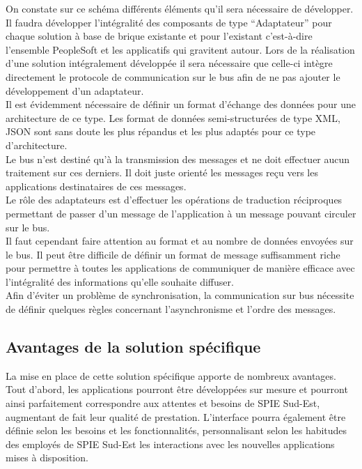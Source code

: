On constate sur ce schéma différents éléments qu’il sera nécessaire de développer. Il faudra développer l’intégralité des composants de type “Adaptateur” pour chaque solution à base de brique existante et pour l’existant c’est-à-dire l’ensemble PeopleSoft et les applicatifs qui gravitent autour. Lors de la réalisation d’une solution intégralement développée il sera nécessaire que celle-ci intègre directement le protocole de communication sur le bus afin de ne pas ajouter le développement d’un adaptateur. \\
    
Il est évidemment nécessaire de définir un format d’échange des données pour une architecture de ce type. Les format de données semi-structurées de type XML, JSON sont sans doute les plus répandus et les plus adaptés pour ce type d’architecture. \\

Le bus n’est destiné qu’à la transmission des messages et ne doit effectuer aucun traitement sur ces derniers. Il doit juste orienté les messages reçu vers les applications destinataires de ces messages. \\

Le rôle des adaptateurs est d’effectuer les opérations de traduction réciproques permettant de passer d’un message de l’application à un message pouvant circuler sur le bus. \\

Il faut cependant faire attention au format et au nombre de données envoyées sur le bus. Il peut être difficile de définir un format de message suffisamment riche pour permettre à toutes les applications de communiquer de manière efficace avec l’intégralité des informations qu’elle souhaite diffuser. \\

Afin d’éviter un problème de synchronisation, la communication sur bus nécessite de définir quelques règles concernant l’asynchronisme et l’ordre des messages. 

\subsection{Avantages de la solution spécifique}

La mise en place de cette solution spécifique apporte de nombreux avantages. Tout d’abord, les applications pourront être développées sur mesure et pourront ainsi parfaitement correspondre aux attentes et besoins de SPIE Sud-Est, augmentant de fait leur qualité de prestation. L’interface pourra également être définie selon les besoins et les fonctionnalités, personnalisant selon les habitudes des employés de SPIE Sud-Est les interactions avec les nouvelles applications mises à disposition. \\

